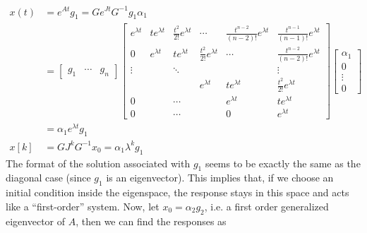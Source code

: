 \documentclass[twoside]{article}
\begin{document}
\begin{align*}
    x(t) &= e^{A t} g_1 = G e^{J t} G^{-1} g_1 \alpha_1
    \\ &= \begin{bmatrix} g_1 & \cdots & g_n \end{bmatrix} 
\begin{bmatrix} e^{\lambda t} & t e^{\lambda t} & \frac{t^2}{2 !} e^{\lambda t} & \cdots & \frac{t^{n-2}}{(n-2) !} e^{\lambda t}  & \frac{t^{n-1}}{(n-1) !} e^{\lambda t} \\
0 & e^{\lambda t} & t e^{\lambda t} & \frac{t^2}{2 !} e^{\lambda t} & \cdots  & \frac{t^{n-2}}{(n-2) !} e^{\lambda t} \\
\vdots & & \ddots & & & \vdots \\
& & & e^{\lambda t} & t e^{\lambda t} & \frac{t^2}{2 !} e^{\lambda t} \\
0 & & \cdots & & e^{\lambda t} & t e^{\lambda t} \\
0 & & \cdots & & 0 & e^{\lambda t} \end{bmatrix}
%
    \begin{bmatrix} \alpha_1 \\ 0 \\ \vdots \\ 0 \end{bmatrix} 
    \\ &= \alpha_1 e^{\lambda t} g_1  
       \\[1ex]
    x[k] &= G J^k G^{-1} x_0 = \alpha_1 \lambda^k g_1   
\end{align*}
%
The format of the solution associated with $g_1$ seems to be exactly the same as the diagonal case (since $g_1$ is an eigenvector). 
This implies that, if we choose an initial condition inside the eigenspace, the response stays in this space and acts like a 
``first-order'' system. Now, let $x_0 = \alpha_2 g_2$, i.e. a first order generalized eigenvector of $A$, then we can find the responses as
%
\end{document}

